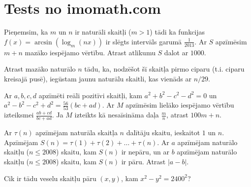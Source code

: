 \documentclass[11pt]{article}
\begin{document}
\section{Tests no imomath.com}



\begin{problem}[ImoMathCom.NT.1]
Pieņemsim, ka $m$ un $n$ ir naturāli skaitļi ($m>1$) tādi ka 
funkcijas $f(x) = \arcsin(\log_m(nx))$ ir slēgts intervāls garumā $\frac{1}{2013}$. 
Ar $S$ apzīmēsim $m+n$ mazāko iespējamo vērtību. 
Atrast atlikumu $S$ dalot ar $1000$. 
\end{problem}


\begin{problem}[ImoMathCom.NT.2]
Atrast mazāko naturālo $n$ tādu, ka, nodzēšot šī skaitļa pirmo ciparu (t.i. ciparu kreisajā pusē), 
iegūstam jaunu naturālu skaitli, kas vienāds ar $n/29$. 
\end{problem}


\begin{problem}[ImoMathCom.NT.3]
Ar $a,b,c,d$ apzīmēti reāli pozitīvi skaitļi, kam $a^2 + b^2 - c^2 - d^2 = 0$ un 
$a^2 - b^2 - c^2 + d^2 = \frac{56}{53}(bc+ad)$. Ar $M$ apzīmēsim 
lielāko iespējamo vērtību izteiksmei $\frac{ab+cd}{bc+ad}$. 
Ja $M$ izteikts kā nesaīsināma daļa $\frac{m}{n}$, atrast $100m+n$. 
\end{problem}

\begin{problem}[ImoMathCom.NT.4]
Ar $\tau(n)$ apzīmējam naturāla skaitļa $n$ dalītāju skaitu, ieskaitot $1$ un $n$. 
Apzīmējam $S(n) = \tau(1) + \tau(2) + \ldots + \tau(n)$. 
Ar $a$ apzīmējam naturālo skaitļu ($n \leq 2008$) skaitu, kam $S(n)$ ir nepāru, un ar $b$ apzīmējam 
naturālo skaitļu ($n \leq 2008$) skaitu, kam $S(n)$ ir pāru. Atrast $|a-b|$. 
\end{problem}

\begin{problem}[ImoMathCom.NT.5]
Cik ir tādu veselu skaitļu pāru $(x,y)$, kam $x^2−y^2=2400^2$? 
\end{problem}
\end{document}
